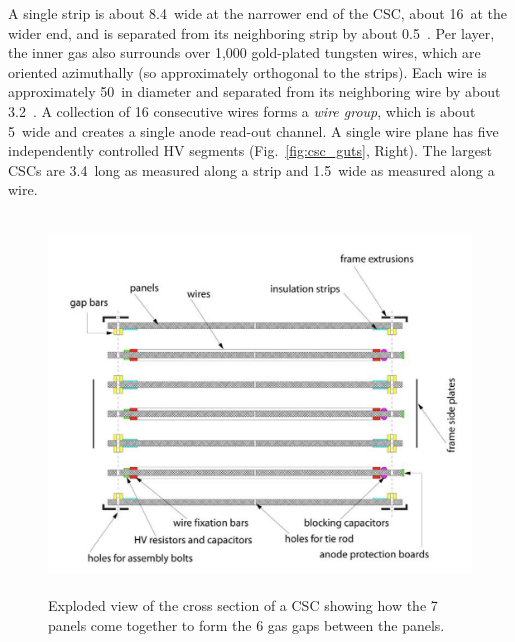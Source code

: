 A single strip is about 8.4~\mm wide at the narrower end of the CSC, about 16~\mm at the wider end, and is separated from its neighboring strip by about 0.5~\mm.
Per layer, the inner gas also surrounds over 1,000 gold-plated tungsten wires, which are oriented azimuthally (so approximately orthogonal to the strips).
Each wire is approximately 50~\mum in diameter and separated from its neighboring wire by about 3.2~\mm.
A collection of 16 consecutive wires forms a \emph{wire group}, which is about 5~\cm wide and creates a single anode read-out channel.
A single wire plane has five independently controlled HV segments (Fig.~\ref{fig:csc_guts}, Right).
The largest CSCs are 3.4~\meter long as measured along a strip and 1.5~\meter wide as measured along a wire.
\begin{figure}[pbth]
    \centering
    \includegraphics[width=15cm,height=10cm,keepaspectratio]{figures/cms/muonsys/csc_separatedlayers.jpeg}
        \caption{
        Exploded view of the cross section of a CSC showing how the 7 panels come together to form the 6 gas gaps between the panels.
        }
        \label{fig:csc_separatelayers}
\end{figure}
